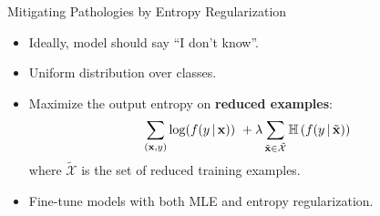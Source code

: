 \begin{frame}{Mitigating Pathologies by Entropy Regularization}
\begin{itemize}
\pause
\item Ideally, model should say ``I don't know''.
\item Uniform distribution over classes.
\pause
\item Maximize the output entropy on \textbf{reduced examples}:  
\begin{equation}
\sum_{(\boldsymbol{\mathbf{x}}, y)}\log(f(y \, | \, \boldsymbol{\mathbf{x}})) \
+ \lambda\sum_{\tilde{\boldsymbol{\mathbf{x}}}\in \tilde{\mathcal{X}}}
\mathbb{H}\left(f(y \, | \, \tilde{\boldsymbol{\mathbf{x}}})\right) \nonumber
\end{equation}
where $\tilde{\mathcal{X}}$ is the set of reduced training examples.
\item Fine-tune models with both MLE and entropy regularization.
\end{itemize}
\end{frame}

